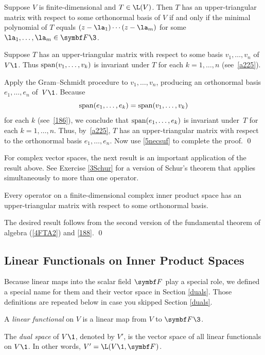 {Suppose $V$ is finite-dimensional and $T \in \L(V)$. Then $T$ has an upper-triangular matrix with respect to some orthonormal basis of $V$ if and only if the minimal polynomial of $T$ equals $(z-\la_1) \cdots (z-\la_m)$ for some
$\la_1, \ldots, \la_m \in \F{}\3$.}

\proof
Suppose $T$ has an upper-triangular matrix with respect to some
basis $v_1, \dots, v_n$ of~$V\1$.  Thus $\operatorname{span}(v_1, \dots, v_k)$ is
invariant under $T$ for each $k = 1, \dots, n$ (see~\ref{a225}).

Apply the Gram--Schmidt procedure to $v_1, \dots, v_n$, producing an
orthonormal basis $e_1, \dots, e_n$ of~$V\1$.  Because
\[
\operatorname{span}(e_1, \dots, e_k) = \operatorname{span}(v_1, \dots, v_k)
\]
for each $k$ (see~\ref{186}), we conclude that
$\operatorname{span}(e_1, \dots, e_k)$ is invariant under~$T$ for each $k = 1, \dots, n$.  Thus,
by~\ref{a225}, $T$ has an upper-triangular matrix with respect to the orthonormal basis
$e_1, \dots, e_n$. Now use \ref{5necsuf} to complete the proof.
\qed


For complex vector spaces, the next result is an important application of the result above. See Exercise \ref{3Schur} for a version of Schur's theorem that applies simultaneously to more than one operator.

{Every operator on a finite-dimensional complex inner product space has an upper-triangular matrix with respect to some orthonormal basis.}

\proof
The desired result follows from the second version of the fundamental theorem of algebra (\ref{4FTA2}) and \ref{188}.
\qed

\subsection{Linear Functionals on Inner Product Spaces}

Because linear maps into the scalar field $\F{}$ play a special role, we defined a special name for them and their vector space in Section \ref{duals}. Those definitions are repeated below in case you skipped Section \ref{duals}.

{\begin{Itemize}
\item
A \emph{linear functional} on $V$ is a linear map from $V$ to $\F{}\3$.
\item
The \emph{dual space} of $V\1$, denoted by $V'\!$, is the vector space of all linear \mbox{functionals} on $V\1$. In other words, $V' = \L(V\1, \F{})$.
\end{Itemize}
}

